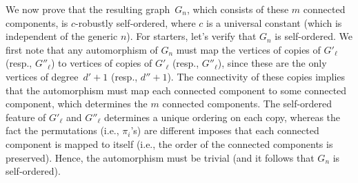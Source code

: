 %
%
%
%
%
%

We now prove that the resulting graph~$G_n$,
which consists of these $m$ connected components,
is $c$-robustly self-ordered, where $c$ is a universal constant
(which is independent of the generic $n$).
For starters, let's verify that $G_n$ is self-ordered.
We first note that any automorphism of $G_n$ must
map the vertices of copies of $G'_\ell$ (resp., $G''_\ell$)
to vertices of copies of $G'_\ell$ (resp., $G''_\ell$),
since these are the only vertices of degree~$d'+1$ (resp., $d''+1$).
The connectivity of these copies implies that
the automorphism must map each connected component
to some connected component,
which  determines the $m$ connected components.
The self-ordered feature of $G'_\ell$ and $G''_\ell$
determines a unique ordering on each copy,
whereas the fact the permutations (i.e., $\pi_i$'s)
are different imposes that each connected
component is mapped to itself
(i.e., the order of the connected components is preserved).
Hence, the automorphism must be trivial
(and it follows that $G_n$ is self-ordered).

%
%
%
%
%
%
%
%
%
%
%

